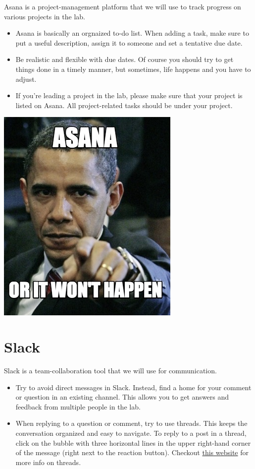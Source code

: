\documentclass[]{book}
\providecommand{\tightlist}{%
  \setlength{\itemsep}{0pt}\setlength{\parskip}{0pt}}
\begin{document}
Asana is a project-management platform that we will use to track progress on various projects in the lab.

\begin{itemize}
\tightlist
\item
  Asana is basically an orgnaized to-do list. When adding a task, make sure to put a useful description, assign it to someone and set a tentative due date.\\
\item
  Be realistic and flexible with due dates. Of course you should try to get things done in a timely manner, but sometimes, life happens and you have to adjust.\\
\item
  If you're leading a project in the lab, please make sure that your project is listed on Asana. All project-related tasks should be under your project.
\end{itemize}

\includegraphics{images/asana.jpg}

\hypertarget{slack}{%
\section{Slack}\label{slack}}

Slack is a team-collaboration tool that we will use for communication.

\begin{itemize}
\tightlist
\item
  Try to avoid direct messages in Slack. Instead, find a home for your comment or question in an existing channel. This allows you to get answers and feedback from multiple people in the lab.\\
\item
  When replying to a question or comment, try to use threads. This keeps the conversation organized and easy to navigate. To reply to a post in a thread, click on the bubble with three horizontal lines in the upper right-hand corner of the message (right next to the reaction button). Checkout \href{https://slack.com/help/articles/115000769927-Use-threads-to-organize-discussions-}{this website} for more info on threads.
\end{itemize}
\end{document}
